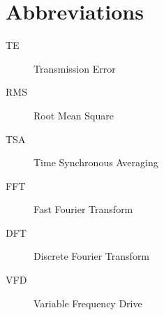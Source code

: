 \chapter*{Abbreviations}\label{abbr}
\begin{description}
\item[TE] Transmission Error
\item[RMS] Root Mean Square
\item[TSA] Time Synchronous Averaging
\item[FFT] Fast Fourier Transform
\item[DFT] Discrete Fourier Transform
\item[VFD] Variable Frequency Drive
\end{description}

